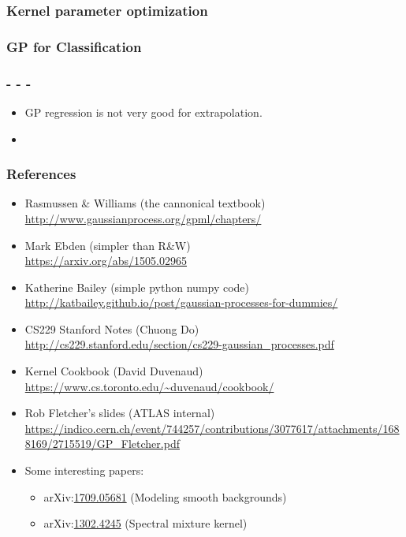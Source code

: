 \begin{frame} \frametitle{Kernel parameter optimization}
\end{frame}

\begin{frame} \frametitle{GP for Classification}
\end{frame}

\begin{frame} \frametitle{- - -}
\begin{itemize}
  \item GP regression is not very good for extrapolation.
  \item {}
\end{itemize}
\end{frame}

\newcommand{\R}[2]{\item #1 \\ {\scriptsize\url{#2}}}
\newcommand{\arxiv}[1]{arXiv:\href{https://arxiv.org/abs/#1}{#1}}

\begin{frame} \frametitle{References}
\begin{itemize}
  \R{Rasmussen \& Williams (the cannonical textbook)}
    {http://www.gaussianprocess.org/gpml/chapters/}
  \R{Mark Ebden {\small(simpler than R\&W)}}
    {https://arxiv.org/abs/1505.02965}
  \R{Katherine Bailey {\small(simple python\,\plus\,numpy code)}}
    {http://katbailey.github.io/post/gaussian-processes-for-dummies/}
  \R{CS229 Stanford Notes (Chuong Do)}
    {http://cs229.stanford.edu/section/cs229-gaussian_processes.pdf}
  \R{Kernel Cookbook (David Duvenaud)}
    {https://www.cs.toronto.edu/~duvenaud/cookbook/}
  \R{Rob Fletcher's slides (ATLAS internal)}
    {https://indico.cern.ch/event/744257/contributions/3077617/attachments/1688169/2715519/GP_Fletcher.pdf}
  \item Some interesting papers:
  \begin{itemize}
    \item \arxiv{1709.05681} (Modeling smooth backgrounds)
    \item \arxiv{1302.4245} (Spectral mixture kernel)
  \end{itemize}
\end{itemize}
\end{frame}

